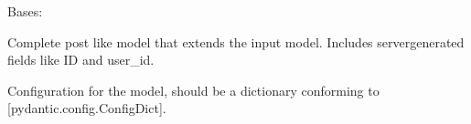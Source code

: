 \documentclass[letterpaper,10pt,openany,oneside,english]{sphinxmanual}
\begin{document}
\begin{savenotes}\begin{fulllineitems}

\pysigstartsignatures
{}
\pysigstopsignatures
\sphinxAtStartPar
Bases: 

\sphinxAtStartPar
Complete post like model that extends the input model.
Includes server\sphinxhyphen{}generated fields like ID and user\_id.


\begin{savenotes}\begin{fulllineitems}

\pysigstartsignatures
{}
\pysigstopsignatures
\end{fulllineitems}\end{savenotes}



\begin{savenotes}\begin{fulllineitems}

\pysigstartsignatures
{}
\pysigstopsignatures
\sphinxAtStartPar
Configuration for the model, should be a dictionary conforming to {[}\sphinxtitleref{ConfigDict}{]}{[}pydantic.config.ConfigDict{]}.

\end{fulllineitems}\end{savenotes}



\begin{savenotes}\begin{fulllineitems}

\pysigstartsignatures
{}
\pysigstopsignatures
\end{fulllineitems}\end{savenotes}


\end{fulllineitems}\end{savenotes}
\end{document}
